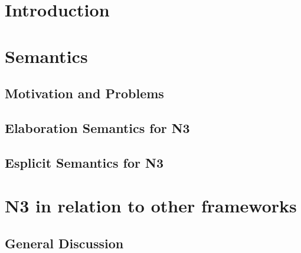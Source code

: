 \documentclass[11pt,a4paper,twoside]{book}
\newcommand\blankpage{%
    \null
    \thispagestyle{empty}%
    \addtocounter{page}{-1}%
    \newpage}
\theoremstyle{remark}
\begin{document}
    
    

    \printglossary[title=List of Abbreviations and Glossary] %

	


\mainmatter

\part{Introduction} \label{intro}





\part{Semantics}\label{semantics}

\chapter{Motivation and Problems}\label{problem}

%
%
%
\chapter{Elaboration Semantics for N3}\label{ela}
\chapter{Esplicit Semantics for N3}\label{exsem}


\part{N3 in relation to other frameworks}\label{others}
\chapter{General Discussion}\label{gen}
\end{document}
